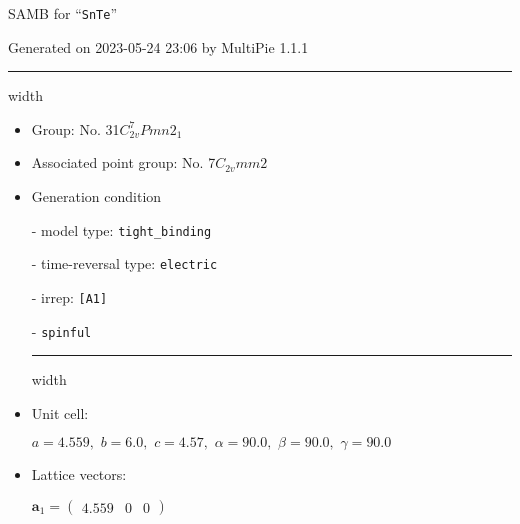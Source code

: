\documentclass[fleqn,10pt,landscape]{article}
\begin{document}
\setcounter{MaxMatrixCols}{16}

\setlength{\baselineskip}{16pt}
\footnotesize
\begin{center}
\LARGE
SAMB for ``\texttt{SnTe}''
\end{center}
\begin{flushright}
Generated on 2023-05-24 23:06 by MultiPie 1.1.1
\end{flushright}
\vspace{1cm}


 \hfil \hrule height 1mm width \textwidth \hfil

\begin{itemize}
\item Group: No. 31\quad$C_{2v}^{7}$\quad$Pmn2_1$\quad[ orthorhombic ]

\item Associated point group: No. 7\quad$C_{2v}$\quad$mm2$\quad[ orthorhombic ]

\vspace{5mm}

\item Generation condition

\quad - model type: \texttt{tight_binding}

\quad - time-reversal type: \texttt{electric}

\quad - irrep: \texttt{[A1]}

\quad - \texttt{spinful}


 \hfil \hrule height 1mm width \textwidth \hfil

\item Unit cell:

\quad $a=4.559,\,\, b=6.0,\,\, c=4.57,\,\, \alpha=90.0,\,\, \beta=90.0,\,\, \gamma=90.0$

\item Lattice vectors:

\quad $\bm{a}_1=\begin{pmatrix} 4.559 & 0 & 0 \end{pmatrix}$


\end{itemize}
\end{document}
